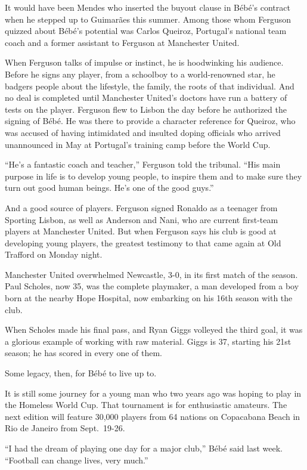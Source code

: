﻿\documentclass[12pt]{article}
\begin{document}
It would have been Mendes who inserted the buyout clause in B\'eb\'e's contract when he stepped up
to Guimarães this summer. Among those whom Ferguson quizzed about B\'eb\'e's potential was Carlos
Queiroz, Portugal's national team coach and a former assistant to Ferguson at Manchester United.

When Ferguson talks of impulse or instinct, he is hoodwinking his audience. Before he signs any
player, from a schoolboy to a world-renowned star, he badgers people about the lifestyle, the
family, the roots of that individual. And no deal is completed until Manchester United's doctors
have run a battery of tests on the player. Ferguson flew to Lisbon the day before he authorized the
signing of B\'eb\'e. He was there to provide a character reference for Queiroz, who was accused of
having intimidated and insulted doping officials who arrived unannounced in May at Portugal's
training camp before the World Cup.

``He's a fantastic coach and teacher,'' Ferguson told the tribunal. ``His main purpose in life is to
develop young people, to inspire them and to make sure they turn out good human beings. He's one of
the good guys.''

And a good source of players. Ferguson signed Ronaldo as a teenager from Sporting Lisbon, as well as
Anderson and Nani, who are current first-team players at Manchester United. But when Ferguson says
his club is good at developing young players, the greatest testimony to that came again at Old
Trafford on Monday night.

Manchester United overwhelmed Newcastle, 3-0, in its first match of the season. Paul Scholes, now
35, was the complete playmaker, a man developed from a boy born at the nearby Hope Hospital, now
embarking on his 16th season with the club.

When Scholes made his final pass, and Ryan Giggs volleyed the third goal, it was a glorious example
of working with raw material. Giggs is 37, starting his 21st season; he has scored in every one of
them.

Some legacy, then, for B\'eb\'e to live up to.

It is still some journey for a young man who two years ago was hoping to play in the Homeless World
Cup. That tournament is for enthusiastic amateurs. The next edition will feature 30,000 players from
64 nations on Copacabana Beach in Rio de Janeiro from Sept.~19-26.

``I had the dream of playing one day for a major club,'' B\'eb\'e said last week. ``Football can
change lives, very much.''
\end{document}
